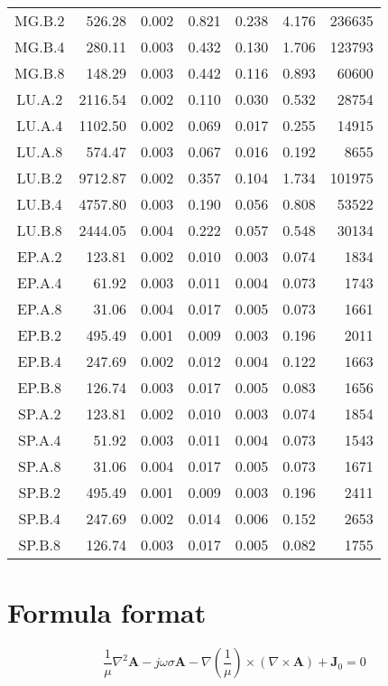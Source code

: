 \begin{ThreePartTable}
\begin{longtable}[c]{c*{6}{r}}
    MG.B.2 & 526.28 & 0.002 & 0.821 & 0.238 & 4.176 & 236635 \\
    MG.B.4 & 280.11 & 0.003 & 0.432 & 0.130 & 1.706 & 123793 \\
    MG.B.8 & 148.29 & 0.003 & 0.442 & 0.116 & 0.893 & 60600 \\
    LU.A.2 & 2116.54 & 0.002 & 0.110 & 0.030 & 0.532 & 28754 \\
    LU.A.4 & 1102.50 & 0.002 & 0.069 & 0.017 & 0.255 & 14915 \\
    LU.A.8 & 574.47 & 0.003 & 0.067 & 0.016 & 0.192 & 8655 \\
    LU.B.2 & 9712.87 & 0.002 & 0.357 & 0.104 & 1.734 & 101975 \\
    LU.B.4 & 4757.80 & 0.003 & 0.190 & 0.056 & 0.808 & 53522 \\
    LU.B.8 & 2444.05 & 0.004 & 0.222 & 0.057 & 0.548 & 30134 \\
    EP.A.2 & 123.81 & 0.002 & 0.010 & 0.003 & 0.074 & 1834 \\
    EP.A.4 & 61.92 & 0.003 & 0.011 & 0.004 & 0.073 & 1743 \\
    EP.A.8 & 31.06 & 0.004 & 0.017 & 0.005 & 0.073 & 1661 \\
    EP.B.2 & 495.49 & 0.001 & 0.009 & 0.003 & 0.196 & 2011 \\
    EP.B.4 & 247.69 & 0.002 & 0.012 & 0.004 & 0.122 & 1663 \\
    EP.B.8 & 126.74 & 0.003 & 0.017 & 0.005 & 0.083 & 1656 \\
    SP.A.2 & 123.81 & 0.002 & 0.010 & 0.003 & 0.074 & 1854 \\
    SP.A.4 & 51.92 & 0.003 & 0.011 & 0.004 & 0.073 & 1543 \\
    SP.A.8 & 31.06 & 0.004 & 0.017 & 0.005 & 0.073 & 1671 \\
    SP.B.2 & 495.49 & 0.001 & 0.009 & 0.003 & 0.196 & 2411 \\
    SP.B.4 \tnote{a} & 247.69 & 0.002 & 0.014 & 0.006 & 0.152 & 2653 \\
    SP.B.8 \tnote{b} & 126.74 & 0.003 & 0.017 & 0.005 & 0.082 & 1755 \\
    \bottomrule
  \end{longtable}
\end{ThreePartTable}

\section{Formula format}

\begin{equation}\label{eq:example}
  \frac{1}{\mu}\nabla^2\mathbf{A}-j\omega\sigma\mathbf{A}
  -\nabla\left(\frac{1}{\mu}\right)\times(\nabla\times\mathbf{A})
  +\mathbf{J}_0=0
\end{equation}

